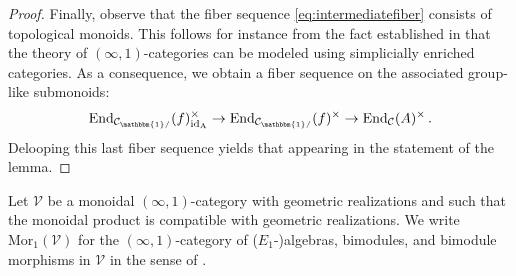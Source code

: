 \documentclass[11pt,reqno]{amsart}
\numberwithin{equation}{section}
\theoremstyle{plain}
\theoremstyle{definition}
\begin{document}
\begin{proof}
Finally, observe that the fiber sequence \eqref{eq:intermediatefiber} consists of topological monoids.
This follows for instance from the fact established in \cite[Proposition 2.2.5.1]{HTT} that the theory of $(\infty,1)$-categories can be modeled using simplicially enriched categories.
As a consequence, we obtain a fiber sequence on the associated group-like submonoids:
$$\mathrm{End}_{\mathcal{C}_{\mathbbm{1}/}}(f)_{\mathrm{id_A}}^{\times}\rightarrow\mathrm{End}_{\mathcal{C}_{\mathbbm{1}/}}(f)^{\times}\rightarrow\mathrm{End}_{\mathcal{C}}(A)^{\times}\,.$$
Delooping this last fiber sequence yields that appearing in the statement of the lemma.
\end{proof}

Let $\mathscr{V}$ be a monoidal $(\infty,1)$-category with geometric realizations and such that the monoidal product is compatible with geometric realizations. We write $\mathrm{Mor}_1(\mathscr{V})$ for the $(\infty,1)$-category of ($E_1$-)algebras, bimodules, and bimodule morphisms in $\mathscr{V}$ in the sense of \cite{Hau}.
\end{document}
